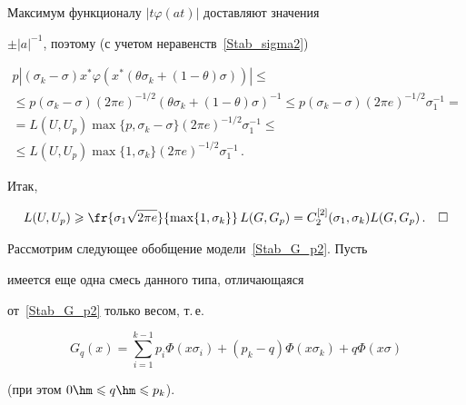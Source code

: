 Максимум функционалу $|t\varphi(at)|$ доставляют значения

$\pm|a|^{-1}$, поэтому (с учетом неравенств~\eqref{Stab_sigma2})

\begin{multline*}

p|(\sigma_k-\sigma)x^*\varphi(x^*(\theta\sigma_k+(1-\theta)\sigma))|\leqslant{}\\

{}\leqslant p(\sigma_k-\sigma)\left(2\pi e\right)^{-1/2}

(\theta\sigma_k+(1-\theta)\sigma)^{-1}\leqslant p(\sigma_k-\sigma)\left(2\pi e\right)^{-1/2}\sigma_1^{-1}={}\\

{}=L(U,U_p)\max\{p,\sigma_k-\sigma\}\left(2\pi e\right)^{-1/2}\sigma_1^{-1}

\leqslant{}\\

{}\leqslant L(U,U_p)\max\{1,\sigma_k\}\left(2\pi e\right)^{-1/2}\sigma_1^{-1}\,.

\end{multline*}



Итак,

\begin{equation*}

L(U,U_p)\geqslant\fr{\sigma_1\sqrt{2\pi e}}{\max\{1,\sigma_k\}}\,L(G,G_p)

=C_2^{[2]}(\sigma_1,\sigma_k)L(G,G_p)\,.~~~\Box

\end{equation*}





\medskip



Рассмотрим следующее обобщение модели~\eqref{Stab_G_p2}. Пусть

имеется еще одна смесь данного типа, отличающаяся

от~\eqref{Stab_G_p2} только весом, т.\,е.\ 

\begin{equation}

\label{Stab_G_q2}

G_q(x)=\sum\limits_{i=1}^{k-1}

p_i\Phi(x\sigma_i)+(p_k-q)\Phi(x\sigma_k)+q\Phi(x\sigma)

\end{equation}

(при этом $0\hm\leqslant q\hm\leqslant p_k$).



